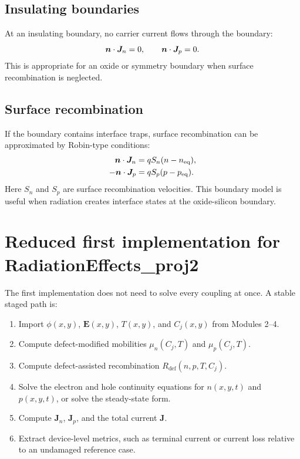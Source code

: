 \documentclass[11pt]{article}
\newcommand{\Evec}{\bm{E}}
\newcommand{\Jvec}{\bm{J}}
\begin{document}
\subsection{Insulating boundaries}

At an insulating boundary, no carrier current flows through the boundary:
\begin{equation}
\nvec\cdot \Jvec_n=0,
\qquad
\nvec\cdot \Jvec_p=0.
\end{equation}
This is appropriate for an oxide or symmetry boundary when surface recombination is neglected.

\subsection{Surface recombination}

If the boundary contains interface traps, surface recombination can be approximated by Robin-type conditions:
\begin{align}
\nvec\cdot \Jvec_n &= q S_n (n-n_{\mathrm{eq}}), \\
-\nvec\cdot \Jvec_p &= q S_p (p-p_{\mathrm{eq}}).
\end{align}
Here \(S_n\) and \(S_p\) are surface recombination velocities. This boundary model is useful when radiation creates interface states at the oxide-silicon boundary.

\section{Reduced first implementation for RadiationEffects\_proj2}

The first implementation does not need to solve every coupling at once. A stable staged path is:

\begin{enumerate}[label=\textbf{Step \arabic*.}, leftmargin=2.2em]
\item Import \(\phi(x,y)\), \(\Evec(x,y)\), \(T(x,y)\), and \(C_j(x,y)\) from Modules 2--4.
\item Compute defect-modified mobilities \(\mu_n(C_j,T)\) and \(\mu_p(C_j,T)\).
\item Compute defect-assisted recombination \(R_{\mathrm{def}}(n,p,T,C_j)\).
\item Solve the electron and hole continuity equations for \(n(x,y,t)\) and \(p(x,y,t)\), or solve the steady-state form.
\item Compute \(\Jvec_n\), \(\Jvec_p\), and the total current \(\Jvec\).
\item Extract device-level metrics, such as terminal current or current loss relative to an undamaged reference case.
\end{enumerate}
\end{document}
